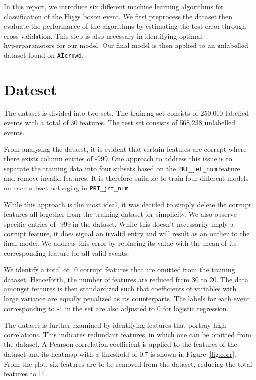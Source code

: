 \documentclass[10pt,conference,compsocconf]{IEEEtran}
\begin{document}
In this report, we introduce six different machine learning algorithms for classification of the Higgs boson event. We first preprocess the dataset then evaluate the performance of the algorithms by estimating the test error through cross validation. This step is also necessary in identifying optimal hyperparameters for our model. Our final model is then applied to an unlabelled dataset found on \texttt{AIcrowd}.


\section{Dateset}
\label{sec:dataset}
The dataset is divided into two sets. The training set consists of 250,000 labelled events with a total of 30 features. The test set consists of 568,238 unlabelled events.

From analysing the dataset, it is evident that certain features are corrupt where there exists column entries of -999. One approach to address this issue is to separate the training data into four subsets based on the \texttt{PRI\_jet\_num} feature and remove invalid features. It is therefore suitable to train four different models on each subset belonging in \texttt{PRI\_jet\_num}.

While this approach is the most ideal, it was decided to simply delete the corrupt features all together from the training dataset for simplicity. We also observe specific entries of -999 in the dataset. While this doesn't necessarily imply a corrupt feature, it does signal an invalid entry and will result as an outlier to the final model. We address this error by replacing its value with the mean of its corresponding feature for all valid events.

We identify a total of 10 corrupt features that are omitted from the training dataset. Henceforth, the number of features are reduced from 30 to 20. The data amongst features is then standardized such that coefficients of variables with large variance are equally penalized as its counterparts. The labels for each event corresponding to -1 in the set are also adjusted to 0 for logistic regression. 

The dataset is further examined by identifying features that portray high correlations. This indicates redundant features, in which one can be omitted from the dataset. A Pearson correlation coefficient is applied to the features of the dataset and its heatmap with a threshold of 0.7 is shown in Figure~\ref{fig:corr}. From the plot, six features are to be removed from the dataset, reducing the total features to 14.
\end{document}
